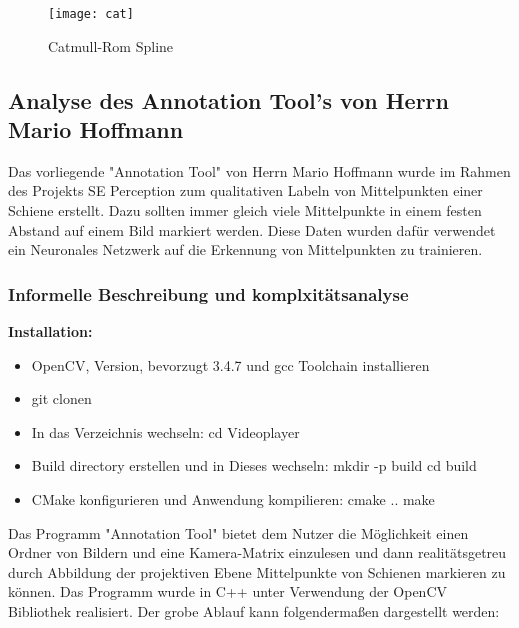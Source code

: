 \documentclass[11pt]{scrartcl}
\begin{document}
\begin{figure}[H]
  \texttt{[image: cat]}
  \caption{Catmull-Rom Spline}
\end{figure}


\subsection{Analyse des Annotation Tool's von Herrn Mario Hoffmann}
\label{sec:Analyse des Annotation Tool's von Herrn Mario Hoffmann}

Das vorliegende "Annotation Tool" von Herrn Mario Hoffmann wurde im Rahmen des Projekts SE Perception zum qualitativen Labeln von Mittelpunkten einer Schiene erstellt. Dazu sollten immer gleich viele Mittelpunkte in einem festen Abstand auf einem Bild markiert werden. Diese Daten wurden dafür verwendet ein Neuronales Netzwerk auf die Erkennung von Mittelpunkten zu trainieren.

\subsubsection{Informelle Beschreibung und komplxitätsanalyse}
\label{Informelle Beschreibung und komplxitätsanalyse}

\textbf{Installation:} 
\begin{itemize}
	\item OpenCV, Version, bevorzugt 3.4.7 und gcc Toolchain installieren
	\item git clonen
	\item In das Verzeichnis wechseln: cd Videoplayer
	\item Build directory erstellen und in Dieses wechseln: mkdir -p build cd build
	\item CMake konfigurieren und Anwendung kompilieren: cmake .. make
\end{itemize}

Das Programm "Annotation Tool" bietet dem Nutzer die Möglichkeit einen Ordner von Bildern und eine Kamera-Matrix einzulesen und dann realitätsgetreu durch Abbildung der projektiven Ebene Mittelpunkte von Schienen markieren zu können. Das Programm wurde in C++ unter Verwendung der OpenCV Bibliothek realisiert.  Der grobe Ablauf kann folgendermaßen dargestellt werden:
\end{document}
